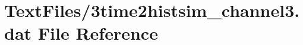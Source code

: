 \hypertarget{3time2histsim__channel3_8dat}{}\section{Text\+Files/3time2histsim\+\_\+channel3.dat File Reference}
\label{3time2histsim__channel3_8dat}
